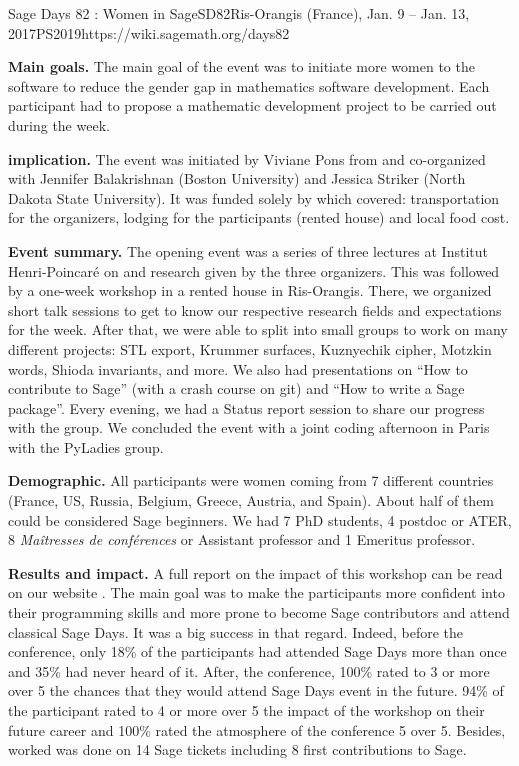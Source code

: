 \begin{event}{Sage Days 82 : Women in Sage}{SD82}{Ris-Orangis (France), Jan. 9 -- Jan. 13, 2017}{PS}{20}{19}{https://wiki.sagemath.org/days82}

\textbf{Main goals.} The main goal of the event was to initiate more women to the software \Sage to reduce the gender gap in mathematics software
development. Each participant had to propose a mathematic development project to be carried out during the week.

\textbf{\ODK implication.} The event was initiated by Viviane Pons from \ODK and co-organized with Jennifer Balakrishnan (Boston University) and Jessica Striker (North Dakota State University). It was funded solely by \ODK which covered: transportation for the organizers, lodging for the participants (rented house) and local food cost.

\textbf{Event summary.} The opening event was a series of three lectures at Institut Henri-Poincaré on \Sage and research given by the three organizers. This was followed by a one-week workshop in a rented house in Ris-Orangis. There, we organized short talk sessions to get to know our respective research fields and expectations for the week. After that, we were able to split into small groups to work on many different projects: STL export, Krummer surfaces, Kuznyechik cipher, Motzkin words, Shioda invariants, and more. We also had presentations on ``How to contribute to Sage'' (with a crash course on git) and ``How to write a Sage package''. Every evening, we had a Status report session to share our progress with the group. We concluded the event with a joint coding afternoon in Paris with the PyLadies group.

\textbf{Demographic.} All participants were women coming from 7 different countries (France, US, Russia, Belgium, Greece, Austria, and Spain). About half of them could be considered Sage beginners. We had 7 PhD students, 4 postdoc or ATER, 8 \textit{Maîtresses de conférences} or Assistant professor and 1 Emeritus professor.

\textbf{Results and impact.} A full report on the impact of this workshop can be read on our website \cite{17PonsSD82}. The main goal was to make the participants more confident into their programming skills and more prone to become Sage contributors and attend classical Sage Days. It was a big success in that regard. Indeed, before the conference, only 18\% of the participants had attended Sage Days more than once and 35\% had never heard of it. After, the conference, 100\% rated to 3 or more over 5 the chances that they would attend Sage Days event in the future. 94\% of the participant rated to 4 or more over 5 the impact of the workshop on their future career and 100\% rated the atmosphere of the conference 5 over 5. Besides, worked was done on 14 Sage tickets including 8 first contributions to Sage.


\end{event}
